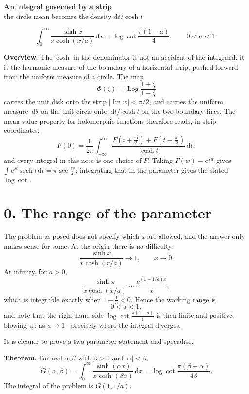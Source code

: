 \documentclass[12pt]{article}
\newcommand{\dd}{\,\mathrm{d}}
\newcommand{\ii}{\mathrm{i}}
\newcommand{\e}{\mathrm{e}}
\newcommand{\Log}{\operatorname{Log}}
\newcommand{\Ip}{\operatorname{Im}}
\begin{document}
\begin{center}
{\Large\bfseries An integral governed by a strip}\\[0.35em]
{\large the circle mean becomes the density \(\mathrm{d}t/\cosh t\)}
\end{center}

\[
\boxed{\displaystyle
\int_0^\infty
\frac{\sinh x}{x\cosh(x/a)}\dd x
=\log\cot\frac{\pi(1-a)}4,
\qquad 0<a<1.}
\]

\textbf{Overview.}
The \(\cosh\) in the denominator is not an accident of the integrand: it
is the harmonic measure of the boundary of a horizontal strip, pushed
forward from the uniform measure of a circle. The map
\[
\Phi(\zeta)=\Log\frac{1+\zeta}{1-\zeta}
\]
carries the unit disk onto the strip \(|\Ip w|<\pi/2\), and carries the
uniform measure \(\dd\theta\) on the unit circle onto
\(\dd t/\cosh t\) on the two boundary lines. The mean-value property for
holomorphic functions therefore reads, in strip coordinates,
\[
F(0)=\frac1{2\pi}\int_{-\infty}^{\infty}
\frac{F(t+\tfrac{\pi\ii}{2})+F(t-\tfrac{\pi\ii}{2})}{\cosh t}\dd t,
\]
and every integral in this note is one choice of \(F\). Taking
\(F(w)=\e^{sw}\) gives \(\int\e^{st}\operatorname{sech}t\dd t=\pi\sec\frac{\pi s}{2}\);
integrating that in the parameter gives the stated \(\log\cot\).

\section*{0. The range of the parameter}

The problem as posed does not specify which \(a\) are allowed, and the
answer only makes sense for some. At the origin there is no difficulty:
\[
\frac{\sinh x}{x\cosh(x/a)}\longrightarrow1,\qquad x\to0.
\]
At infinity, for \(a>0\),
\[
\frac{\sinh x}{x\cosh(x/a)}
\sim
\frac{\e^{(1-1/a)x}}{x},
\]
which is integrable exactly when \(1-\frac1a<0\). Hence the working range
is
\[
\boxed{0<a<1,}
\]
and note that the right-hand side \(\log\cot\frac{\pi(1-a)}4\) is then
finite and positive, blowing up as \(a\to1^-\) precisely where the
integral diverges.

It is cleaner to prove a two-parameter statement and specialise.

\textbf{Theorem.} For real \(\alpha,\beta\) with \(\beta>0\) and
\(|\alpha|<\beta\),
\[
\boxed{\displaystyle
G(\alpha,\beta)=
\int_0^\infty
\frac{\sinh(\alpha x)}{x\cosh(\beta x)}\dd x
=\log\cot\frac{\pi(\beta-\alpha)}{4\beta}.}
\tag{$\ast$}
\]
The integral of the problem is \(G(1,1/a)\).
\end{document}
